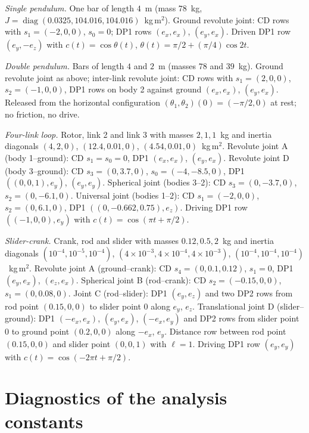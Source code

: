 \documentclass[preprint,12pt]{elsarticle}
\begin{document}
\emph{Single pendulum.} One bar of length $4$~m (mass $78$~kg,
$J=\operatorname{diag}(0.0325,104.016,104.016)$~kg\,m$^2$). Ground revolute joint: CD rows with
$s_1=(-2,0,0)$, $s_0=0$; DP1 rows $(e_x,e_x)$, $(e_y,e_x)$. Driven DP1 row $(e_y,-e_z)$ with
$c(t)=\cos\theta(t)$, $\theta(t)=\pi/2+(\pi/4)\cos 2t$.

\emph{Double pendulum.} Bars of length $4$ and $2$~m (masses $78$ and $39$~kg). Ground revolute
joint as above; inter-link revolute joint: CD rows with $s_1=(2,0,0)$, $s_2=(-1,0,0)$, DP1 rows on
body 2 against ground $(e_x,e_x)$, $(e_y,e_x)$. Released from the horizontal configuration
$(\theta_1,\theta_2)(0)=(-\pi/2,0)$ at rest; no friction, no drive.

\emph{Four-link loop.} Rotor, link 2 and link 3 with masses $2,1,1$~kg and inertia diagonals
$(4,2,0)$, $(12.4,0.01,0)$, $(4.54,0.01,0)$~kg\,m$^2$. Revolute joint A (body 1--ground): CD
$s_1=s_0=0$, DP1 $(e_x,e_x)$, $(e_y,e_x)$. Revolute joint D (body 3--ground): CD $s_3=(0,3.7,0)$,
$s_0=(-4,-8.5,0)$, DP1 $((0,0,1),e_y)$, $(e_y,e_y)$. Spherical joint (bodies 3--2): CD
$s_3=(0,-3.7,0)$, $s_2=(0,-6.1,0)$. Universal joint (bodies 1--2): CD $s_1=(-2,0,0)$,
$s_2=(0,6.1,0)$, DP1 $((0,-0.662,0.75),e_z)$. Driving DP1 row $((-1,0,0),e_y)$ with
$c(t)=\cos(\pi t+\pi/2)$.

\emph{Slider-crank.} Crank, rod and slider with masses $0.12,0.5,2$~kg and inertia diagonals
$(10^{-4},10^{-5},10^{-4})$, $(4\times10^{-3},4\times10^{-4},4\times10^{-3})$,
$(10^{-4},10^{-4},10^{-4})$~kg\,m$^2$. Revolute joint A (ground--crank): CD $s_4=(0,0.1,0.12)$,
$s_1=0$, DP1 $(e_y,e_x)$, $(e_z,e_x)$. Spherical joint B (rod--crank): CD $s_2=(-0.15,0,0)$,
$s_1=(0,0.08,0)$. Joint C (rod--slider): DP1 $(e_y,e_z)$ and two DP2 rows from rod point
$(0.15,0,0)$ to slider point $0$ along $e_y$, $e_z$. Translational joint D (slider--ground): DP1
$(-e_x,e_x)$, $(e_y,e_x)$, $(-e_x,e_y)$ and DP2 rows from slider point $0$ to ground point
$(0.2,0,0)$ along $-e_x$, $e_y$. Distance row between rod point $(0.15,0,0)$ and slider point
$(0,0,1)$ with $\ell=1$. Driving DP1 row $(e_y,e_y)$ with $c(t)=\cos(-2\pi t+\pi/2)$.

\section{Diagnostics of the analysis constants}
\label{app:diagnostics}
\end{document}

